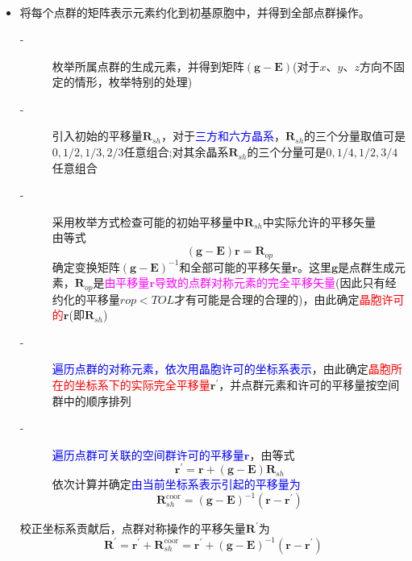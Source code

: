 \begin{itemize}
\begin{enumerate}
\begin{displaymath}
\begin{matrix}
					\end{matrix}
				\end{displaymath}
		\end{enumerate}
	\item 将每个点群的矩阵表示元素约化到初基原胞中，并得到全部点群操作。
		\begin{description}
			\item[-] 枚举所属点群的生成元素，并得到矩阵$(\mathbf{g}-\mathbf{E})$(对于$x$、$y$、$z$方向不固定的情形，枚举特别的处理)
			\item[-] 引入初始的平移量$\mathbf{R}_{sh}$，对于\textcolor{blue}{三方和六方晶系}，$\mathbf{R}_{sh}$的三个分量取值可是$0,1/2,1/3,2/3$任意组合;对其余晶系$\mathbf{R}_{sh}$的三个分量可是$0,1/4,1/2,3/4$任意组合
			\item[-]采用枚举方式检查可能的初始平移量中$\mathbf{R}_{sh}$中实际允许的平移矢量\\
				由等式
				\begin{displaymath}
					(\mathbf{g}-\mathbf{E})\mathbf{r}=\mathbf{R}_{op}
				\end{displaymath}
				确定变换矩阵$(\mathbf{g}-\mathbf{E})^{-1}$和全部可能的平移矢量$\mathbf{r}$。这里$\mathbf{g}$是点群生成元素，$\mathbf{R}_{op}$是\textcolor{magenta}{由平移量$\mathbf{r}$导致的点群对称元素的完全平移矢量}(因此只有经约化的平移量$\mathit{rop}<\mathit{TOL}$才有可能是合理的合理的)，由此确定\textcolor{red}{晶胞许可的}$\mathbf{r}$(即$\mathbf{R}_{sh}$)
			\item[-] \textcolor{blue}{遍历点群的对称元素，依次用晶胞许可的坐标系表示}，由此确定\textcolor{red}{晶胞所在的坐标系下的实际完全平移量}$\mathbf{r}^{\prime}$，并点群元素和许可的平移量按空间群中的顺序排列
			\item[-] \textcolor{blue}{遍历点群可关联的空间群许可的平移量$\mathbf{r}$}，由等式
		\begin{displaymath}
			\mathbf{r}^{\prime}=\mathbf{r}+(\mathbf{g}-\mathbf{E})\mathbf{R}_{sh}
		\end{displaymath}
		依次计算并确定\textcolor{blue}{由当前坐标系表示引起的平移量为}
		\begin{displaymath}
			\mathbf{R}_{sh}^{\mathrm{coor}}=(\mathbf{g}-\mathbf{E})^{-1}(\mathbf{r}-\mathbf{r}^{\prime})
		\end{displaymath}
		\end{description}
		校正坐标系贡献后，点群对称操作的平移矢量$\mathbf{R}^{\prime}$为
		\begin{displaymath}
			\mathbf{R}^{\prime}=\mathbf{r}^{\prime}+\mathbf{R}_{sh}^{\mathrm{coor}}=\mathbf{r}^{\prime}+(\mathbf{g}-\mathbf{E})^{-1}(\mathbf{r}-\mathbf{r}^{\prime})
		\end{displaymath}


\end{itemize}
